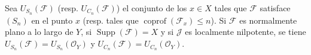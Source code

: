 \begin{corollary}[6.10.4]
\label{IV.2.s6.10.4-fr}
Sea $U_{S_n}(\mathcal F)$ \textup{(resp.} $U_{C_n}(\mathcal F)$) el conjunto de los
$x\in X$ tales que $\mathcal F$ satisface $(S_n)$ en el punto $x$ \textup{(resp.} tales que
$\operatorname{coprof}(\mathcal F_x)\leq n$). Si $\mathcal F$ es normalmente
plano a lo largo de $Y$, si $\operatorname{Supp}(\mathcal F)=X$ y si $\mathcal J$
es localmente nilpotente, se tiene
$U_{S_n}(\mathcal F)=U_{S_n}(\mathcal O_Y)$ y
$U_{C_n}(\mathcal F)=U_{C_n}(\mathcal O_Y)$.
\end{corollary}
